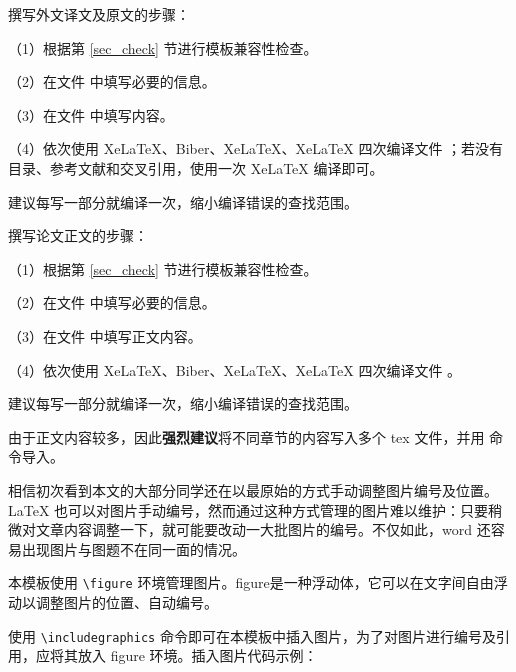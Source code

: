 
撰写外文译文及原文的步骤：

（1）根据第 \ref{sec_check} 节进行模板兼容性检查。

（2）在文件  中填写必要的信息。

（3）在文件  中填写内容。

（4）依次使用 XeLaTeX、Biber、XeLaTeX、XeLaTeX 四次编译文件 ；若没有目录、参考文献和交叉引用，使用一次 XeLaTeX 编译即可。

建议每写一部分就编译一次，缩小编译错误的查找范围。



撰写论文正文的步骤：

（1）根据第 \ref{sec_check} 节进行模板兼容性检查。

（2）在文件  中填写必要的信息。

（3）在文件  中填写正文内容。

（4）依次使用 XeLaTeX、Biber、XeLaTeX、XeLaTeX 四次编译文件 。

建议每写一部分就编译一次，缩小编译错误的查找范围。

由于正文内容较多，因此\textbf{强烈建议}将不同章节的内容写入多个 tex 文件，并用 \verb!! 命令导入。



相信初次看到本文的大部分同学还在以最原始的方式手动调整图片编号及位置。 \LaTeX{} 也可以对图片手动编号，然而通过这种方式管理的图片难以维护：只要稍微对文章内容调整一下，就可能要改动一大批图片的编号。不仅如此，word 还容易出现图片与图题不在同一面的情况。

本模板使用 \verb!\figure! 环境管理图片。figure是一种浮动体，它可以在文字间自由浮动以调整图片的位置、自动编号。

使用 \verb!\includegraphics! 命令即可在本模板中插入图片，为了对图片进行编号及引用，应将其放入 figure 环境。插入图片代码示例：

